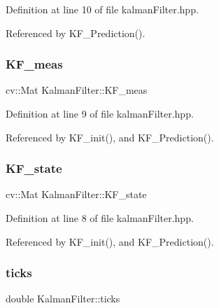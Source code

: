 Definition at line 10 of file kalman\+Filter.\+hpp.



Referenced by K\+F\+\_\+\+Prediction().

\mbox{\label{class_kalman_filter_ab8ea794012f17385fead830634b1c1ed}} 
\subsubsection{\texorpdfstring{K\+F\+\_\+meas}{KF\_meas}}
{\footnotesize\ttfamily cv\+::\+Mat Kalman\+Filter\+::\+K\+F\+\_\+meas\hspace{0.3cm}{\ttfamily [private]}}



Definition at line 9 of file kalman\+Filter.\+hpp.



Referenced by K\+F\+\_\+init(), and K\+F\+\_\+\+Prediction().

\mbox{\label{class_kalman_filter_a279304db3b9574783b2724ab2ed989af}} 
\subsubsection{\texorpdfstring{K\+F\+\_\+state}{KF\_state}}
{\footnotesize\ttfamily cv\+::\+Mat Kalman\+Filter\+::\+K\+F\+\_\+state\hspace{0.3cm}{\ttfamily [private]}}



Definition at line 8 of file kalman\+Filter.\+hpp.



Referenced by K\+F\+\_\+init(), and K\+F\+\_\+\+Prediction().

\mbox{\label{class_kalman_filter_a9f9d6412ec56e87e78fe1de185bef4b8}} 
\subsubsection{\texorpdfstring{ticks}{ticks}}
{\footnotesize\ttfamily double Kalman\+Filter\+::ticks\hspace{0.3cm}{\ttfamily [private]}}



